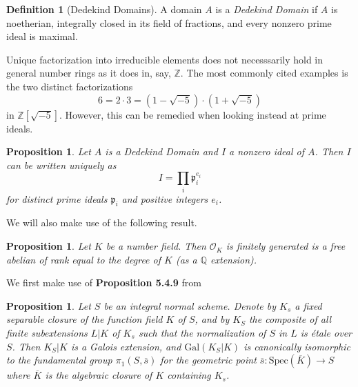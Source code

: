 \documentclass{article}
\theoremstyle{definition}
\newtheorem{definition}[theorem]{Definition}
\theoremstyle{remark}
\theoremstyle{plain}
\newtheorem{proposition}[theorem]{Proposition}
\newcommand{\Z}{\mathbb{Z}}
\newcommand{\Q}{\mathbb{Q}}
\newcommand{\mc}[1]{\mathcal{#1}}
\newcommand{\mk}[1]{\mathfrak{#1}}
\begin{document}
\begin{definition}[Dedekind Domains]
	A domain $A$ is a \textit{Dedekind Domain} if $A$ is noetherian, integrally closed in its field of fractions, and every nonzero prime ideal is maximal.
\end{definition}

Unique factorization into irreducible elements does not necesssarily hold in general number rings as it does in, say, $\Z$.
The most commonly cited examples is the two distinct factorizations 
\[6 = 2\cdot3 = (1 - \sqrt{-5})\cdot (1 + \sqrt{-5})\]
in $\Z[\sqrt{-5}]$.
However, this can be remedied when looking instead at prime ideals.


\begin{proposition}

Let $A$ is a Dedekind Domain and $I$ a nonzero ideal of $A$.
Then $I$ can be written uniquely as 
\[I = \prod_{i} \mk{p}_i^{e_i}\]
for distinct prime ideals $\mk{p}_i$ and positive integers $e_i$.
\end{proposition} 

We will also make use of the following result.
\begin{proposition}
	Let $K$ be a number field.
	Then $\mc{O}_K$ is finitely generated is a free abelian of rank equal to the degree of $K$ (as a $\Q$ extension).
\end{proposition}

We first make use of \textbf{Proposition 5.4.9} from \cite{Szamuely}

\begin{proposition}
	Let $S$ be an integral normal scheme.
	Denote by $K_s$ a fixed separable closure of the function field $K$ of $S$, and by $K_S$ the composite of all finite subextensions $L|K$ of $K_s$ such that the normalization of $S$ in $L$ is \'etale over $S$.
	Then $K_S|K$ is a Galois extension, and $\text{Gal}(K_S|K)$ is canonically isomorphic to the fundamental group $\pi_1(S, \overline{s})$ for the geometric point $\overline{s}: \text{Spec}(\overline{K} ) \to S$ where $\overline{K}$ is the algebraic closure of $K$ containing $K_s$.

\end{proposition}
\end{document}

